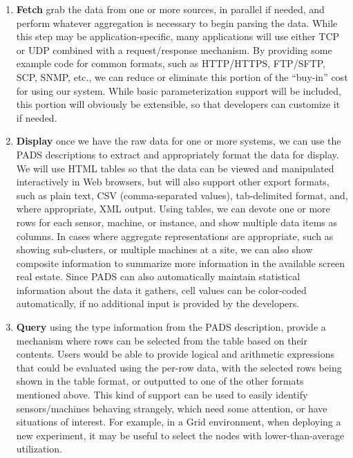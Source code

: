 \begin{enumerate}

\item {\bf Fetch} grab the data from one or more sources, in parallel if
needed, and perform whatever aggregation is necessary to begin parsing
the data. While this step may be application-specific, many
applications will use either TCP or UDP combined with a
request/response mechanism. By providing some example code for common
formats, such as HTTP/HTTPS, FTP/SFTP, SCP, SNMP, etc., we can reduce
or eliminate this portion of the ``buy-in'' cost for using our system.
While basic parameterization support will be included, this portion
will obviously be extensible, so that developers can customize it if
needed.

\item {\bf Display} once we have the raw data for one or more systems, we
can use the PADS descriptions to extract and appropriately format the
data for display. We will use HTML tables so that the data can be
viewed and manipulated interactively in Web browsers, but will also
support other export formats, such as plain text, CSV (comma-separated
values), tab-delimited format, and, where appropriate, XML
output. Using tables, we can devote one or more rows for each sensor,
machine, or instance, and show multiple data items as columns. In
cases where aggregate representations are appropriate, such as showing
sub-clusters, or multiple machines at a site, we can also show
composite information to summarize more information in the available
screen real estate. Since PADS can also automatically maintain
statistical information about the data it gathers, cell values can be
color-coded automatically, if no additional input is provided by the
developers.

\item {\bf Query} using the type information from the PADS description,
provide a mechanism where rows can be selected from the table based on
their contents. Users would be able to provide logical and arithmetic
expressions that could be evaluated using the per-row data, with the
selected rows being shown in the table format, or outputted to one of
the other formats mentioned above. This kind of support can be used to
easily identify sensors/machines behaving strangely, which need some
attention, or have situations of interest. For example, in a Grid
environment, when deploying a new experiment, it may be useful to
select the nodes with lower-than-average utilization.


\end{enumerate}
